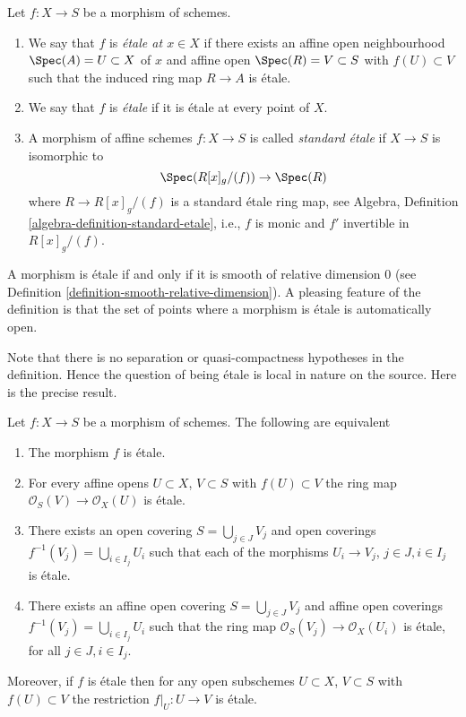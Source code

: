 \begin{definition}
\label{definition-etale}
Let $f : X \to S$ be a morphism of schemes.
\begin{enumerate}
\item We say that $f$ is {\it \'etale at $x \in X$} if
there exists an affine open neighbourhood $\Spec(A) = U \subset X$
of $x$ and affine open $\Spec(R) = V \subset S$
with $f(U) \subset V$ such that the induced ring map
$R \to A$ is \'etale.
\item We say that $f$ is {\it \'etale} if it is \'etale at every point of $X$.
\item A morphism of affine schemes $f : X \to S$ is called
{\it standard \'etale} if $X \to S$ is isomorphic to
$$
\Spec(R[x]_g/(f)) \to \Spec(R)
$$
where $R \to R[x]_g/(f)$ is a standard \'etale ring map, see
Algebra, Definition \ref{algebra-definition-standard-etale},
i.e., $f$ is monic and $f'$ invertible in $R[x]_g/(f)$.
\end{enumerate}
\end{definition}

\noindent
A morphism is \'etale if and only if it is smooth of relative dimension $0$
(see Definition \ref{definition-smooth-relative-dimension}).
A pleasing feature of the definition is that the set of points
where a morphism is \'etale is automatically open.

\medskip\noindent
Note that there is no separation or quasi-compactness hypotheses in the
definition. Hence the question of being \'etale is local in nature on
the source. Here is the precise result.

\begin{lemma}
\label{lemma-etale-characterize}
Let $f : X \to S$ be a morphism of schemes.
The following are equivalent
\begin{enumerate}
\item The morphism $f$ is \'etale.
\item For every affine opens $U \subset X$, $V \subset S$
with $f(U) \subset V$ the ring map
$\mathcal{O}_S(V) \to \mathcal{O}_X(U)$ is \'etale.
\item There exists an open covering $S = \bigcup_{j \in J} V_j$
and open coverings $f^{-1}(V_j) = \bigcup_{i \in I_j} U_i$ such
that each of the morphisms $U_i \to V_j$, $j\in J, i\in I_j$
is \'etale.
\item There exists an affine open covering $S = \bigcup_{j \in J} V_j$
and affine open coverings $f^{-1}(V_j) = \bigcup_{i \in I_j} U_i$ such
that the ring map $\mathcal{O}_S(V_j) \to \mathcal{O}_X(U_i)$ is
\'etale, for all $j\in J, i\in I_j$.
\end{enumerate}
Moreover, if $f$ is \'etale then for
any open subschemes $U \subset X$, $V \subset S$ with $f(U) \subset V$
the restriction $f|_U : U \to V$ is \'etale.
\end{lemma}

